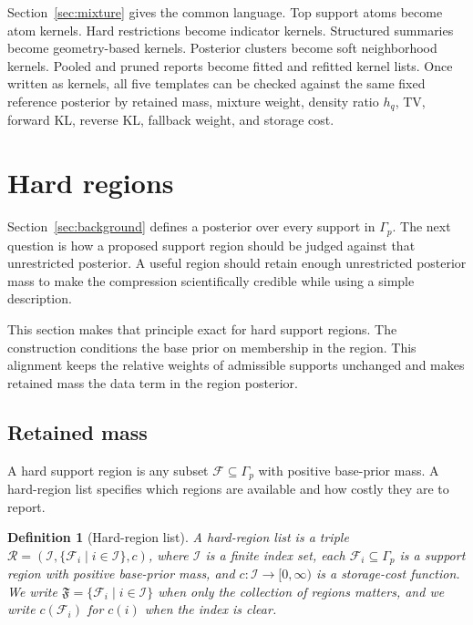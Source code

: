 \documentclass[twoside,11pt]{article}
\newtheorem{definition}{Definition}
\newcommand{\F}{\mathcal{F}}
\newcommand{\Fp}{\mathfrak{F}}
\begin{document}
Section~\ref{sec:mixture} gives the common language. Top support atoms become atom kernels. Hard restrictions become indicator kernels. Structured summaries become geometry-based kernels. Posterior clusters become soft neighborhood kernels. Pooled and pruned reports become fitted and refitted kernel lists. Once written as kernels, all five templates can be checked against the same fixed reference posterior by retained mass, mixture weight, density ratio \(h_q\), TV, forward KL, reverse KL, fallback weight, and storage cost.

\section{Hard regions}
\label{sec:identity}

Section~\ref{sec:background} defines a posterior over every support in \(\Gamma_p\). The next question is how a proposed support region should be judged against that unrestricted posterior. A useful region should retain enough unrestricted posterior mass to make the compression scientifically credible while using a simple description.

This section makes that principle exact for hard support regions. The construction conditions the base prior on membership in the region. This alignment keeps the relative weights of admissible supports unchanged and makes retained mass the data term in the region posterior.

\subsection{Retained mass}

A hard support region is any subset \(\F \subseteq \Gamma_p\) with positive base-prior mass. A hard-region list specifies which regions are available and how costly they are to report.

\begin{definition}[Hard-region list]
\label{def:representation}
A hard-region list is a triple \(\mathcal R=(\mathcal I,\{\F_i \mid i\in\mathcal I\},c)\), where \(\mathcal I\) is a finite index set, each \(\F_i\subseteq\Gamma_p\) is a support region with positive base-prior mass, and \(c \colon \mathcal I\to[0,\infty)\) is a storage-cost function. We write \(\Fp=\{\F_i \mid i\in\mathcal I\}\) when only the collection of regions matters, and we write \(c(\F_i)\) for \(c(i)\) when the index is clear.
\end{definition}
\end{document}
